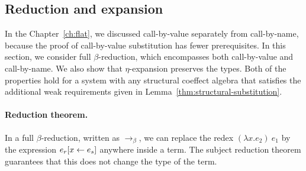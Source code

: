 
\subsection{Reduction and expansion}
\label{sec:struct-syntactic-thms}

In the Chapter~\ref{ch:flat}, we discussed call-by-value separately from call-by-name, because the
proof of call-by-value substitution has fewer prerequisites. In this section, we consider full
$\beta$-reduction, which encompasses both call-by-value and call-by-name. We also show that
$\eta$-expansion preserves the types. Both of the properties hold for a system with any
structural coeffect algebra that satisfies the additional weak requirements given in Lemma~\ref{thm:structural-substitution}.

\paragraph{Reduction theorem.} In a full $\beta$-reduction,
written as $\rightarrow_\beta$, we can replace the redex $(\lambda x.e_2)~e_1$ by the
expression $e_r[x \leftarrow e_s]$ anywhere inside a term. The subject reduction theorem
guarantees that this does not change the type of the term.

